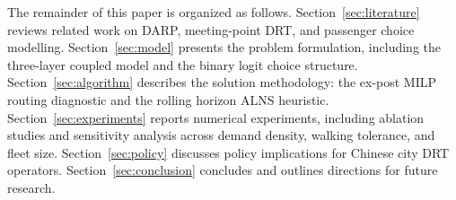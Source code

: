 The remainder of this paper is organized as follows.
Section~\ref{sec:literature} reviews related work on DARP, meeting-point DRT, and
passenger choice modelling.
Section~\ref{sec:model} presents the problem formulation, including the three-layer
coupled model and the binary logit choice structure.
Section~\ref{sec:algorithm} describes the solution methodology: the ex-post MILP routing
diagnostic and the rolling horizon ALNS heuristic.
Section~\ref{sec:experiments} reports numerical experiments, including ablation
studies and sensitivity analysis across demand density, walking tolerance, and fleet
size.
Section~\ref{sec:policy} discusses policy implications for Chinese city DRT operators.
Section~\ref{sec:conclusion} concludes and outlines directions for future research.
